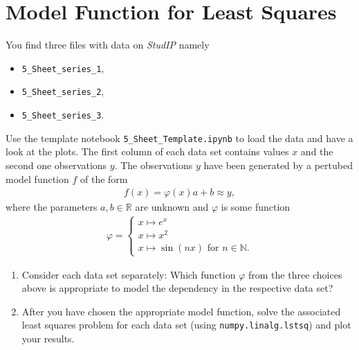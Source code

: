 \section{Model Function for Least Squares}
You find three files with data on \textit{StudIP} namely 
\begin{itemize}
	\item \verb|5_Sheet_series_1|,
	\item \verb|5_Sheet_series_2|,
	\item \verb|5_Sheet_series_3|.
\end{itemize}
Use the template notebook \verb|5_Sheet_Template.ipynb| to load the data and have a look at the plots. The first column of each data set contains values $x$ and the second one observations $y$. The observations $y$ have been generated by a pertubed model function $f$ of the form
\begin{align*}
f(x)= \varphi(x)a + b \approx y,
\end{align*}
where the parameters $a,b \in \mathbb{R}$ are unknown and $\varphi$ is some function
\begin{align*}
\varphi = \begin{cases}
x \mapsto e^x\\
x \mapsto x^2\\
x \mapsto \sin(nx) \textrm{ for } n \in \mathbb{N}.
\end{cases}
\end{align*}
\begin{enumerate}
	\item Consider each data set separately: Which function $\varphi$ from the three choices above
	is appropriate to model the dependency in the respective data set?
	\item After you have chosen the appropriate model function, solve the associated least squares problem for each data set (using \verb|numpy.linalg.lstsq|) and plot your results.
\end{enumerate}